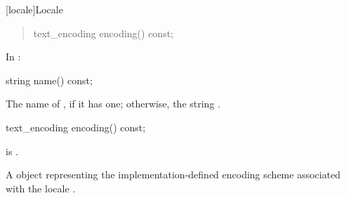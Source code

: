 \documentclass{wg21}
\begin{document}
[locale]{Locale}

\begin{quote}
\begin{codeblock}
namespace std {
  class locale {
  public:
    [...]

    // locale operations
    string name() const;
\end{codeblock}
\begin{addedblock}
\begin{codeblock}
    text_encoding encoding() const;
\end{codeblock}
\end{addedblock}
\begin{codeblock}
  };
}
\end{codeblock}
\end{quote}

In :

\begin{itemdecl}
string name() const;
\end{itemdecl}

\begin{itemdescr}
\pnum
\returns
The name of
,
if it has one; otherwise, the string .
\end{itemdescr}

\begin{addedblock}
\begin{itemdecl}
text_encoding encoding() const;
\end{itemdecl}

\begin{itemdescr}

\mandates {} is .

\returns A  object representing the implementation-defined encoding scheme associated with the locale .

\end{itemdescr}

%
%
%
%
\end{addedblock}
\end{document}
